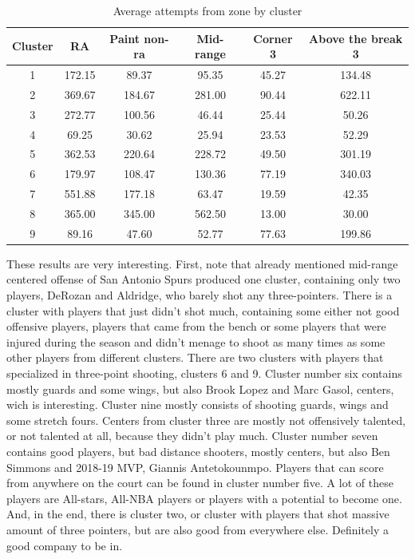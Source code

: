 \documentclass[a4paper]{article}
\begin{document}
\begin{table}[!h]
\begin{center}
\begin{tabular}{|c|c|c|c|c|c|} \hline
Cluster & RA & Paint non-ra & Mid-range & Corner 3 & Above the break 3 \\ \hline
 1 & 172.15 &  89.37 &  95.35 & 45.27 & 134.48 \\ \hline
 2 & 369.67 & 184.67 & 281.00 & 90.44 & 622.11 \\ \hline
 3 & 272.77 & 100.56 &  46.44 & 25.44 &  50.26 \\ \hline
 4 &  69.25 &  30.62 &  25.94 & 23.53 &  52.29 \\ \hline
 5 & 362.53 & 220.64 & 228.72 & 49.50 & 301.19 \\ \hline
 6 & 179.97 & 108.47 & 130.36 & 77.19 & 340.03 \\ \hline
 7 & 551.88 & 177.18 &  63.47 & 19.59 &  42.35 \\ \hline
 8 & 365.00 & 345.00 & 562.50 & 13.00 &  30.00 \\ \hline
 9 &  89.16 &  47.60 &  52.77 & 77.63 & 199.86 \\ \hline
\end{tabular}
\caption{Average attempts from zone by cluster}
\label{tab:avg_by_clst}
\end{center}
\end{table}

These results are very interesting. First, note that already mentioned mid-range centered offense of San Antonio Spurs produced one cluster, containing only two players, DeRozan and Aldridge, who barely shot any three-pointers. There is a cluster with players that just didn't shot much, containing some either not good offensive players, players that came from the bench or some players that were injured during the season and didn't menage to shoot as many times as some other players from different clusters. There are two clusters with players that specialized in three-point shooting, clusters 6 and 9. Cluster number six contains mostly guards and some wings, but also Brook Lopez and Marc Gasol, centers, wich is interesting. Cluster nine mostly consists of shooting guards, wings and some stretch fours. Centers from cluster three are mostly not offensively talented, or not talented at all, because they didn't play much. Cluster number seven contains good players, but bad distance shooters, mostly centers, but also Ben Simmons and 2018-19 MVP, Giannis Antetokounmpo. Players that can score from anywhere on the court can be found in cluster number five. A lot of these players are All-stars, All-NBA players or players with a potential to become one. And, in the end, there is cluster two, or cluster with players that shot massive amount of three pointers, but are also good from everywhere else. Definitely a good company to be in.
\end{document}
